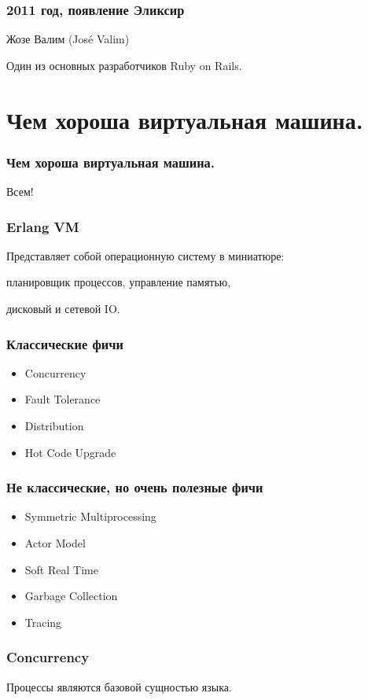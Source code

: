 \documentclass[10pt]{beamer}
\begin{document}
\begin{frame}
\frametitle{2011 год, появление Эликсир}
\centering
Жозе Валим (José Valim)
\par \bigskip
Один из основных разработчиков Ruby on Rails.
\end{frame}


\section{Чем хороша виртуальная машина.}

{
\begin{frame}
\frametitle{Чем хороша виртуальная машина.}
\centering
Всем!
\end{frame}
}

\begin{frame}
\frametitle{Erlang VM}
\centering
Представляет собой операционную систему в миниатюре:
\par \bigskip
планировщик процессов, управление памятью,
\par
дисковый и сетевой IO.
\end{frame}

\begin{frame}
\frametitle{Классические фичи}
\begin{itemize}
\item Concurrency
\item Fault Tolerance
\item Distribution
\item Hot Code Upgrade
\end{itemize}
\end{frame}

\begin{frame}
\frametitle{Не классические, но очень полезные фичи}
\begin{itemize}
\item Symmetric Multiprocessing
\item Actor Model
\item Soft Real Time
\item Garbage Collection
\item Tracing
\end{itemize}
\end{frame}

\begin{frame}
\frametitle{Concurrency}
\centering
Процессы являются базовой сущностью языка.
\par \bigskip
\end{frame}
\end{document}
